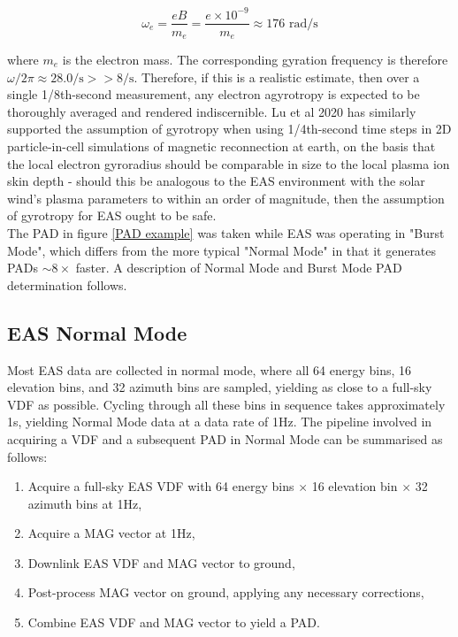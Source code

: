\[\omega_{e}=\frac{eB}{m_{e}}=\frac{e\times10^{-9}}{m_{e}}\approx176\textrm{ rad/s}\]

where \(m_{e}\) is the electron mass. The corresponding gyration frequency is therefore \(\omega/2\pi\approx28.0\textrm{/s}>>8\textrm{/s}\). Therefore, if this is a realistic estimate, then over a single 1/8th-second measurement, any electron agyrotropy is expected to be thoroughly averaged and rendered indiscernible. Lu et al 2020 has similarly supported the assumption of  gyrotropy when using 1/4th-second time steps in 2D particle-in-cell simulations of magnetic reconnection at earth, on the basis that the local electron gyroradius should be comparable in size to the local plasma ion skin depth - should this be analogous to the EAS environment with the solar wind's plasma parameters to within an order of magnitude, then the assumption of gyrotropy for EAS ought to be safe\cite{lu2020}\cite{lu2019}.
\\

The PAD in figure \ref{PAD example} was taken while EAS was operating in "Burst Mode", which differs from the more typical "Normal Mode" in that it generates PADs \(\sim8\times\) faster. A description of Normal Mode and Burst Mode PAD determination follows.



\subsection{EAS Normal Mode} \label{EAS Normal Mode}

Most EAS data are collected in normal mode, where all 64 energy bins, 16 elevation bins, and 32 azimuth bins are sampled, yielding as close to a full-sky VDF as possible. Cycling through all these bins in sequence takes approximately 1s, yielding Normal Mode data at a data rate of 1Hz. The pipeline involved in acquiring a VDF and a subsequent PAD in Normal Mode can be summarised as follows\cite{owen2020}:

\begin{enumerate}
    \item Acquire a full-sky EAS VDF with 64 energy bins \(\times\) 16 elevation bin \(\times\) 32 azimuth bins at 1Hz,
    \item Acquire a MAG vector at 1Hz,
    \item Downlink EAS VDF and MAG vector to ground,
    \item Post-process MAG vector on ground, applying any necessary corrections,
    \item Combine EAS VDF and MAG vector to yield a PAD.
\end{enumerate}

